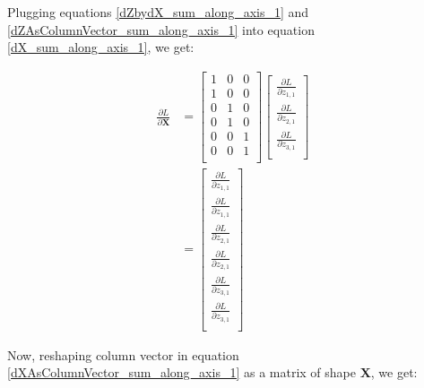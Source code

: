 \documentclass{article}
\newcommand{\matr}[1]{\mathbf{#1}} %
\begin{document}
Plugging equations \ref{dZbydX_sum_along_axis_1} and \ref{dZAsColumnVector_sum_along_axis_1} into equation \ref{dX_sum_along_axis_1}, we get:

\begin{align}
\frac{\partial L}{\partial \matr{X}} &=
\begin{bmatrix}
1 & 0 & 0 \\%
1 & 0 & 0 \\%
0 & 1 & 0 \\%
0 & 1 & 0 \\%
0 & 0 & 1 \\%
0 & 0 & 1 \\%
\end{bmatrix}
\begin{bmatrix}
\frac{\partial L}{\partial z_{1,1}} \\[0.7em]
\frac{\partial L}{\partial z_{2,1}} \\[0.7em]
\frac{\partial L}{\partial z_{3,1}} \\[0.7em]
\end{bmatrix}
\nonumber \\
&=
\begin{bmatrix}
\frac{\partial L}{\partial z_{1,1}} \\[0.7em]
\frac{\partial L}{\partial z_{1,1}} \\[0.7em]
\frac{\partial L}{\partial z_{2,1}} \\[0.7em]
\frac{\partial L}{\partial z_{2,1}} \\[0.7em]
\frac{\partial L}{\partial z_{3,1}} \\[0.7em]
\frac{\partial L}{\partial z_{3,1}} \\[0.7em]
\end{bmatrix} \label{dXAsColumnVector_sum_along_axis_1}
\end{align}

Now, reshaping column vector in equation \ref{dXAsColumnVector_sum_along_axis_1} as a matrix of shape $\matr{X}$, we get:
\end{document}
